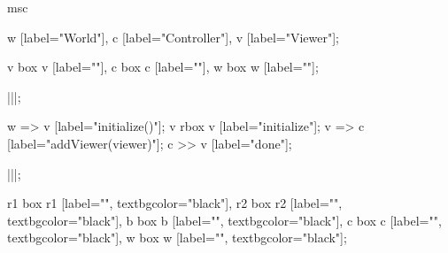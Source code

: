 \begin{msc}
msc
{

w [label="World"],
c [label="Controller"],
v [label="Viewer"];

v box v [label=""],
c box c [label=""],
w box w [label=""];

|||;

w => v [label="initialize()"];
v rbox v [label="initialize"];
v => c [label="addViewer(viewer)"];
c >> v [label="done"];

|||;

r1 box r1 [label="", textbgcolor="black"],
r2 box r2 [label="", textbgcolor="black"],
b box b [label="", textbgcolor="black"],
c box c [label="", textbgcolor="black"],
w box w [label="", textbgcolor="black"];

}
\end{msc}
